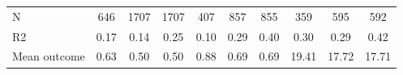 \begin{tabular}{lccc|ccc|ccc}
N           &         646         &        1707         &        1707         &         407         &         857         &         855         &         359         &         595         &         592         \\
R2          &        0.17         &        0.14         &        0.25         &        0.10         &        0.29         &        0.40         &        0.30         &        0.29         &        0.42         \\
Mean outcome&        0.63         &        0.50         &        0.50         &        0.88         &        0.69         &        0.69         &       19.41         &       17.72         &       17.71         \\
\bottomrule \end{tabular}
